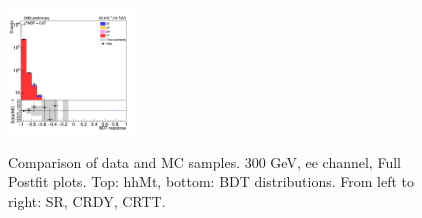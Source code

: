 \begin{figure}[tbp]
\begin{center}
    \includegraphics[width=0.31\textwidth]{figures/ee_300_july20/bdt_response_ee_CRTT_FullPostfit_plot_july20.png}\\
    \caption{Comparison of data and MC samples. 300 GeV, ee channel, Full Postfit plots. Top: hhMt, bottom: BDT distributions. From left to right: SR, CRDY, CRTT.}
    \label{fig:MCcomparison_ee_300}
  \end{center}
\end{figure}





